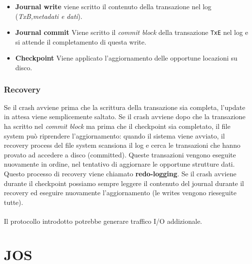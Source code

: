 \documentclass[12pt, letterpaper]{article}
\begin{document}
				\begin{itemize}
					\item \textbf{Journal write} viene scritto il contenuto della transazione nel log (\textit{TxB,metadati e dati}).
					\item \textbf{Journal commit} Viene scritto il \textit{commit block }della transazione \texttt{TxE} nel log e si attende il completamento di questa write.
					\item \textbf{Checkpoint} Viene applicato l'aggiornamento delle opportune locazioni su disco.
				\end{itemize}		
			
			\subsubsection{Recovery}	
				Se il crash avviene prima che la scrittura della transazione sia completa, l'update in attesa viene semplicemente saltato. Se il crash avviene dopo che la transazione ha scritto nel \textit{commit block} ma prima che il checkpoint sia completato, il file system può riprendere l'aggiornamento: quando il sistema viene avviato, il recovery process del file system scansiona il log e cerca le transazioni che hanno provato ad accedere a disco (committed). Queste transazioni vengono eseguite nuovamente in ordine, nel tentativo di aggiornare le opportune strutture dati. Questo processo di recovery viene chiamato \textbf{redo-logging}. Se il crash avviene durante il checkpoint possiamo sempre leggere il contenuto del journal durante il recovery ed eseguire nuovamente l'aggiornamento (le writes vengono rieseguite tutte).\\\\
				Il protocollo introdotto potrebbe generare traffico I/O addizionale. 
				
\newpage
	\section{JOS}
\end{document}
